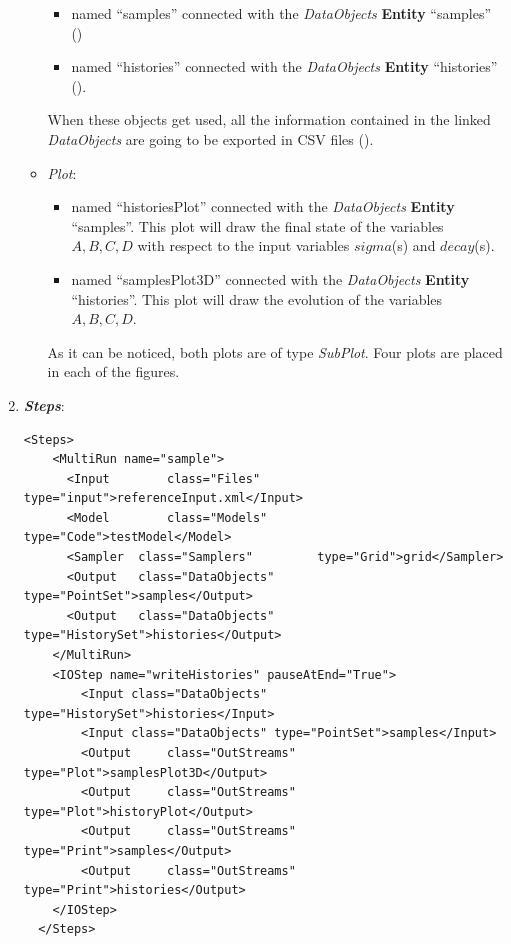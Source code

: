 \begin{enumerate}
\begin{itemize}
     \begin{itemize}
       \item named ``samples'' connected with the \textit{DataObjects} \textbf{Entity} ``samples'' 
                ()
       \item named ``histories'' connected with the \textit{DataObjects} \textbf{Entity} ``histories'' ().
     \end{itemize}         
      When these objects get used, all the information contained in the 
      linked  \textit{DataObjects} are going 
    to be exported in CSV files ().
    \item \textit{Plot}: 
    \begin{itemize}
      \item named ``historiesPlot'' connected with the  \textit{DataObjects} 
      \textbf{Entity} ``samples''.  This plot will draw the final state of the
      variables $A,B,C,D$ with respect to the input variables $sigma$(s) 
      and $decay$(s).
      \item named ``samplesPlot3D'' connected with the  
      \textit{DataObjects} \textbf{Entity} ``histories''. This plot will draw the 
      evolution of the variables $A,B,C,D$.
    \end{itemize}
     As it can be noticed, both plots are of type \textit{SubPlot}. Four plots
     are placed in each of the figures.
  \end{itemize}   
   \item \textbf{\textit{Steps}}:   
\begin{lstlisting}[style=XML,morekeywords={arg,extension,pauseAtEnd,overwrite}]
  <Steps>
    <MultiRun name="sample">
      <Input 	    class="Files" 			 type="input">referenceInput.xml</Input>
      <Model 	    class="Models" 		 type="Code">testModel</Model>
      <Sampler 	class="Samplers" 		 type="Grid">grid</Sampler>
      <Output 	class="DataObjects"  type="PointSet">samples</Output>
      <Output 	class="DataObjects"  type="HistorySet">histories</Output>
    </MultiRun>
    <IOStep name="writeHistories" pauseAtEnd="True">
        <Input class="DataObjects" type="HistorySet">histories</Input>
        <Input class="DataObjects" type="PointSet">samples</Input>
        <Output 	class="OutStreams" type="Plot">samplesPlot3D</Output>
        <Output 	class="OutStreams" type="Plot">historyPlot</Output>
        <Output 	class="OutStreams" type="Print">samples</Output>
        <Output 	class="OutStreams" type="Print">histories</Output>
    </IOStep>
  </Steps>

\end{lstlisting}
\end{enumerate}
